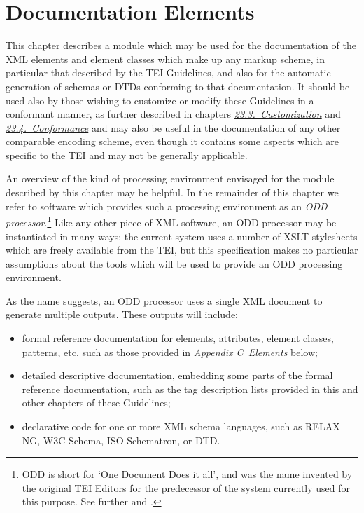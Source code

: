 
\section[{Documentation Elements}]{Documentation Elements}\label{TD}\par
This chapter describes a module which may be used for the documentation of the XML elements and element classes which make up any markup scheme, in particular that described by the TEI Guidelines, and also for the automatic generation of schemas or DTDs conforming to that documentation. It should be used also by those wishing to customize or modify these Guidelines in a conformant manner, as further described in chapters \textit{\hyperref[MD]{23.3.\ Customization}} and \textit{\hyperref[CF]{23.4.\ Conformance}} and may also be useful in the documentation of any other comparable encoding scheme, even though it contains some aspects which are specific to the TEI and may not be generally applicable.\par
An overview of the kind of processing environment envisaged for the module described by this chapter may be helpful. In the remainder of this chapter we refer to software which provides such a processing environment as an \textit{ODD processor}.\footnote{ODD is short for ‘One Document Does it all’, and was the name invented by the original TEI Editors for the predecessor of the system currently used for this purpose. See further \cite{Burnard1995b} and \cite{TD-BIBL-01}.} Like any other piece of XML software, an ODD processor may be instantiated in many ways: the current system uses a number of XSLT stylesheets which are freely available from the TEI, but this specification makes no particular assumptions about the tools which will be used to provide an ODD processing environment.\par
As the name suggests, an ODD processor uses a single XML document to generate multiple outputs. These outputs will include: \begin{itemize}
\item formal reference documentation for elements, attributes, element classes, patterns, etc. such as those provided in \textit{\hyperref[REF-ELEMENTS]{Appendix C\ Elements}} below;
\item detailed descriptive documentation, embedding some parts of the formal reference documentation, such as the tag description lists provided in this and other chapters of these Guidelines;
\item declarative code for one or more XML schema languages, such as RELAX NG, W3C Schema, ISO Schematron, or DTD.
\end{itemize} \par
